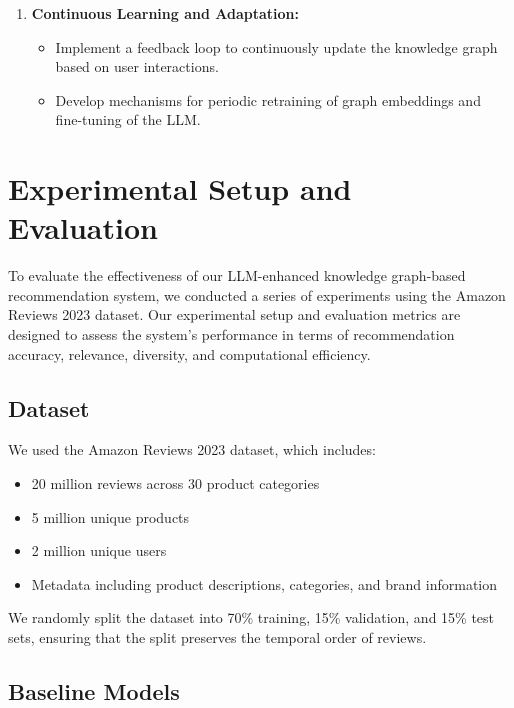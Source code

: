 \documentclass{article}
\begin{document}
\begin{enumerate}
    \item \textbf{Continuous Learning and Adaptation:}
    \begin{itemize}
        \item Implement a feedback loop to continuously update the knowledge graph based on user interactions.
        \item Develop mechanisms for periodic retraining of graph embeddings and fine-tuning of the LLM.
    \end{itemize}
\end{enumerate}


\section{Experimental Setup and Evaluation}

To evaluate the effectiveness of our LLM-enhanced knowledge graph-based recommendation system, we conducted a series of experiments using the Amazon Reviews 2023 dataset. Our experimental setup and evaluation metrics are designed to assess the system's performance in terms of recommendation accuracy, relevance, diversity, and computational efficiency.

\subsection{Dataset}

We used the Amazon Reviews 2023 dataset, which includes:
\begin{itemize}
    \item 20 million reviews across 30 product categories
    \item 5 million unique products
    \item 2 million unique users
    \item Metadata including product descriptions, categories, and brand information
\end{itemize}

We randomly split the dataset into 70\% training, 15\% validation, and 15\% test sets, ensuring that the split preserves the temporal order of reviews.

\subsection{Baseline Models}
\end{document}

